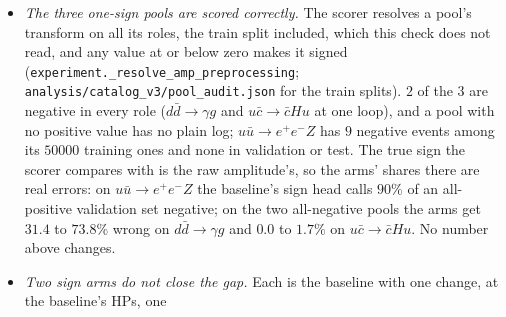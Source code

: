 \documentclass[11pt]{article}
\newcommand{\code}[1]{\texttt{#1}}
\begin{document}
\begin{itemize}
    $12$ pools it was fitted on. Every arm is worse than one sign per pool on $8$ to $11$ of the $17$ and gets more than half of the signs wrong on $1$ to
    $4$. On $e^+e^-\to c\bar cg$ ($28\%$ negative, the classifier $0.7\%$ wrong) every arm gets $71$ to $72\%$ wrong: it
    predicts the minority sign on nearly every event.
  \item \emph{The three one-sign pools are scored correctly.} The scorer resolves a pool's transform on all its
    roles, the train split included, which this check does not read, and any value at or below zero makes it signed
    (\code{experiment.\_resolve\_amp\_preprocessing}; \code{analysis/catalog\_v3/pool\_audit.json} for the train
    splits). $2$ of the $3$ are negative in every role ($d\bar d\to\gamma g$ and $u\bar c\to\bar c H u$ at one loop),
    and a pool with no positive value has no plain log; $u\bar u\to e^+e^-Z$ has $9$ negative events among its
    $50000$ training ones and none in validation or test. The true sign the scorer compares with is the raw
    amplitude's, so the arms' shares there are real errors: on $u\bar u\to e^+e^-Z$ the baseline's sign head calls
    $90\%$ of an all-positive validation set negative; on the two all-negative pools the arms get $31.4$ to $73.8\%$
    wrong on $d\bar d\to\gamma g$ and $0.0$ to $1.7\%$ on $u\bar c\to\bar c H u$. No number above changes.
  \item \emph{Two sign arms do not close the gap.} Each is the baseline with one change, at the baseline's HPs, one

\end{itemize}
\end{document}
